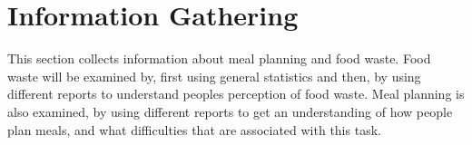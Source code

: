 \chapter{Information Gathering}\label{InformationGathering}
This section collects information about meal planning and food waste. Food waste will be examined by, first using general statistics and then, by using different reports to understand peoples perception of food waste. Meal planning is also examined, by using different reports to get an understanding of how people plan meals, and what difficulties that are associated with this task. 
 






%



%
